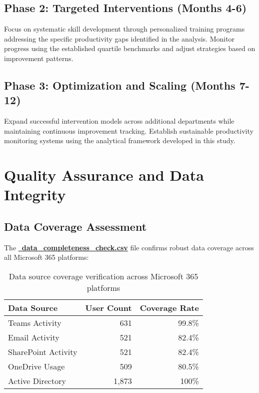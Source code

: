 \documentclass[12pt,a4paper]{article}
\begin{document}
\subsection{Phase 2: Targeted Interventions (Months 4-6)}

Focus on systematic skill development through personalized training programs addressing the specific productivity gaps identified in the analysis. Monitor progress using the established quartile benchmarks and adjust strategies based on improvement patterns.

\subsection{Phase 3: Optimization and Scaling (Months 7-12)}

Expand successful intervention models across additional departments while maintaining continuous improvement tracking. Establish sustainable productivity monitoring systems using the analytical framework developed in this study.

\section{Quality Assurance and Data Integrity}

\subsection{Data Coverage Assessment}

The \textcolor{successGreen}{\href{https://fixysaskihumorizijuv.supabase.co/storage/v1/object/public/research-files/28c816b5-f241-4749-80a7-f8e75b78f052-data_completeness_check.csv?download=}{{\normalsize\faShieldAlt}\, \textbf{data\_completeness\_check.csv}}} file confirms robust data coverage across all Microsoft 365 platforms:

\begin{table}[H]
\centering
\begin{tabular}{@{}lrr@{}}
\toprule
\textbf{\color{primaryBlue}Data Source} & \textbf{\color{primaryBlue}User Count} & \textbf{\color{primaryBlue}Coverage Rate} \\
\midrule
Teams Activity & 631 & 99.8\% \\
Email Activity & 521 & 82.4\% \\
SharePoint Activity & 521 & 82.4\% \\
OneDrive Usage & 509 & 80.5\% \\
Active Directory & 1,873 & 100\% \\
\bottomrule
\end{tabular}
\caption{Data source coverage verification across Microsoft 365 platforms}
\end{table}
\end{document}
